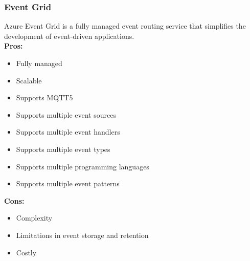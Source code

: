         \subsubsection{Event Grid}
        \label{azure:event-grid}
        Azure Event Grid is a fully managed event routing service that simplifies the development of event-driven applications.\\
        \textbf{Pros:}
        \begin{itemize}
            \item Fully managed
            \item Scalable
            \item Supports MQTT5
            \item Supports multiple event sources
            \item Supports multiple event handlers
            \item Supports multiple event types
            \item Supports multiple programming languages
            \item Supports multiple event patterns
        \end{itemize}
        \textbf{Cons:}
        \begin{itemize}
            \item Complexity
            \item Limitations in event storage and retention
            \item Costly
        \end{itemize}

